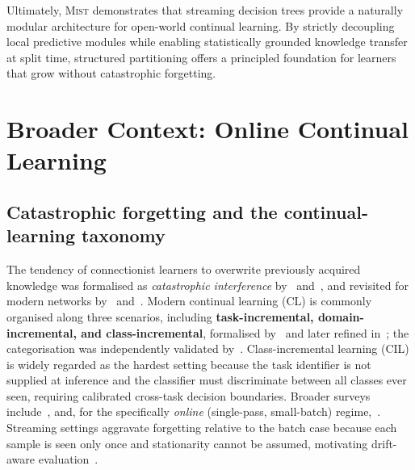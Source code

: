 \documentclass{article}
\newcommand{\mist}{\textsc{Mist}}
\begin{document}
Ultimately, \mist{} demonstrates that streaming decision trees provide a naturally modular architecture for open-world continual learning. By strictly decoupling local predictive modules while enabling statistically grounded knowledge transfer at split time, structured partitioning offers a principled foundation for learners that grow without catastrophic forgetting.

\newpage



\newpage
\appendix



\section{Broader Context: Online Continual Learning}
\label{app:related_work}

\subsection{Catastrophic forgetting and the continual-learning taxonomy}
\label{app:related_work:taxonomy}

The tendency of connectionist learners to overwrite previously acquired knowledge was
formalised as \emph{catastrophic interference} by~\cite{mccloskey1989catastrophic}
and~\cite{ratcliff1990connectionist}, and revisited for modern networks
by~\cite{french1999catastrophic} and~\cite{goodfellow2013empirical}.
Modern continual learning (CL) is commonly organised along three scenarios, including \textbf{task-incremental, domain-incremental, and class-incremental}, formalised
by~\cite{vandeven2019three} and later refined in~\cite{vandeven2022three};
the categorisation was independently validated by~\cite{hsu2018reevaluating}.
Class-incremental learning (CIL) is widely regarded as the hardest setting because
the task identifier is not supplied at inference and the classifier must discriminate
between all classes ever seen, requiring calibrated cross-task decision boundaries.
Broader surveys include~\cite{parisi2019continual,delange2022survey}, and,
for the specifically \emph{online} (single-pass, small-batch) regime,~\cite{mai2022online}.
Streaming settings aggravate forgetting relative to the batch case because each sample
is seen only once and stationarity cannot be assumed, motivating drift-aware
evaluation~\cite{ghunaim2023realtime}.
\end{document}
